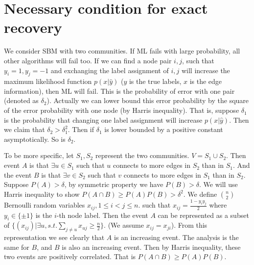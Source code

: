 \documentclass{article}
\begin{document}
\section{Necessary condition for exact recovery}
We consider SBM with two communities.
If ML fails with large probability,
all other algorithms will fail too. If we can find
a node pair $i,j$, such that $y_i=1, y_j=-1$ and
exchanging the label assignment of $i,j$ will increase
the maximum likelihood function $p(x|\hat{y})$ ($y$ is the
true labels, $x$ is the edge information),
then ML will fail. This is the probability of error
with one pair (denoted as $\delta_2$).
Actually we can lower bound this error
probability by the square of the error probability
with one node (by Harris inequality).
That is, suppose $\delta_1$ is the probability that
changing one label assignment will increase
$p(x|\hat{y})$.
Then we claim that
$\delta_2 > \delta_1^2$. Then if $\delta_1$ is lower bounded by a positive
constant asymptotically. So is $\delta_2$.

To be more specific, let $S_1,
S_2$ represent the two communities.
$V=S_1\cup S_2$.
Then event $A$ is that
$\exists u \in S_1$ such that $u$ connects
to more edges in $S_2$ than in $S_1$.
And the event $B$ is that
$\exists v \in S_2$
such that $v$ connects
to more edges in $S_1$ than in $S_2$.
Suppose $P(A)>\delta$, by symmetric property
we have $P(B)>\delta$. We will use
Harris inequality \cite{hi} to show $P(A\cap B)
\geq P(A)P(B) > \delta^2$.
We define $\binom{n}{2}$ Bernoulli random
variables $x_{ij}, 1\leq i < j\leq n$. such that
$x_{ij}=\frac{1 - y_iy_j}{2}$ where $y_i \in \{\pm 1\}$
is the $i$-th node label. Then the event
$A$ can be represented as a subset of
$\{(x_{ij})| \exists u, s.t. \sum_{j\neq u} x_{uj} \geq \frac{n}{2}\}$.
(We assume $x_{ij}=x_{ji}$). From this
representation we see clearly that $A$
is an increasing event. The analysis
is the same for $B$, and $B$
is also an increasing event. Then
by Harris inequality, these two
events are positively correlated.
That is $P(A\cap B)
\geq P(A)P(B)$.
\end{document}
